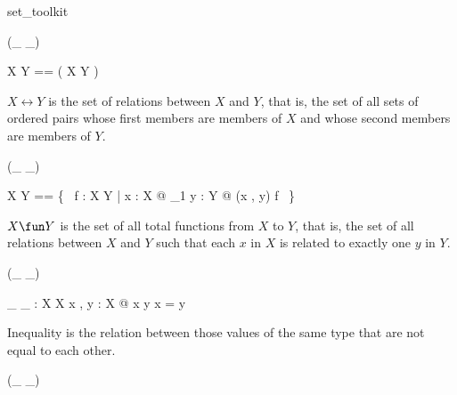 \documentclass[draft,a4paper,10pt,wd]{isov2}
\begin{document}

\begin{zsection}
\SECTION set\_toolkit
\end{zsection}


\begin{zed}
 \rightassoc (\_ \rel \_)
\end{zed}

\begin{zed}
X \rel Y == \power ( X \cross Y )
\end{zed}

$X \rel Y$ is the set of relations between $X$ and $Y$,
that is, the set of all sets of ordered pairs whose first members
are members of $X$ and whose second members are members of $Y$.


\begin{zed}
 \rightassoc (\_ \fun \_)
\end{zed}

\begin{zed}
X \fun Y == \{~ f : X \rel Y | \forall x : X @ \exists_1 y : Y @ (x , y) \in f ~\}
\end{zed}

$X \fun Y$ is the set of all total functions from $X$ to $Y$,
that is, the set of all relations between $X$ and $Y$
such that each $x$ in $X$ is related to exactly one $y$ in $Y$.



\begin{zed}
\relation (\_ \neq \_)
\end{zed}

\begin{gendef}[X]
\_ \neq \_ : X \rel X
\where
\forall x , y : X @ x \neq y \iff \lnot x = y
\end{gendef}

Inequality is the relation between those values of the same type
that are not equal to each other.


\begin{zed}
\relation (\_ \notin \_)
\end{zed}
\end{document}
